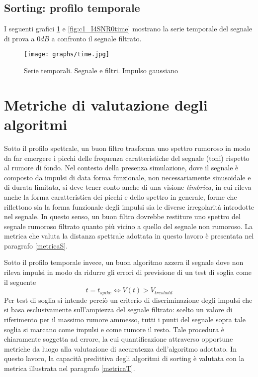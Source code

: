 \documentclass[9pt,twocolumn,twoside]{osajnl}
\begin{document}
\subsection{Sorting: profilo temporale}

I seguenti grafici \ref{fig:c1_I2SNR0time} e \ref{fig:c1_I4SNR0time} mostrano la serie temporale del segnale di prova a $0dB$ a confronto il segnale filtrato.

\begin{figure}[htbp]
\centering
\texttt{[image: graphs/time.jpg]}
\caption{Serie temporali. Segnale e filtri. Impulso gaussiano}
\label{fig:c1_I2SNR0time}
\end{figure}





\section{Metriche di valutazione degli algoritmi}

Sotto il profilo spettrale, un buon filtro trasforma uno spettro rumoroso in modo da far emergere i picchi delle frequenza caratteristiche del segnale (toni) rispetto al rumore di fondo.
%
Nel contesto della presenza simulazione, dove il segnale è composto da impulsi di data forma funzionale, non necessariamente sinusoidale e di durata limitata, si deve tener conto anche di una visione {\it timbrica}, in cui rileva anche la forma caratteristica dei picchi e dello spettro in generale, forme che riflettono sia la forma funzionale degli impulsi sia le diverse irregolarità introdotte nel segnale.
%
In questo senso, un buon filtro dovrebbe restiture uno spettro del segnale rumoroso filtrato quanto più vicino a quello del segnale non rumoroso.
La metrica che valuta la distanza spettrale adottata in questo lavoro è presentata nel paragrafo \ref{metricaS}.

Sotto il profilo temporale invece, un buon algoritmo azzera il segnale dove non rileva impulsi in modo da ridurre gli errori di previsione di un test di soglia come il seguente
\begin{equation*}
t = t_{spike} \Leftrightarrow V(t) > V_{treshold}
\end{equation*}
Per test di soglia si intende perciò un criterio di discriminazione degli impulsi che si basa esclusivamente sull'ampiezza del segnale filtrato: scelto un valore di riferimento per il massimo rumore ammesso, tutti i punti del segnale sopra tale soglia si marcano come impulsi e come rumore il resto.
Tale procedura è chiaramente soggetta ad errore, la cui quantificazione 
attraverso opportune metriche da luogo alla valutazione di accuratezza dell'algoritmo adottato. In questo lavoro, la capacità predittiva degli algoritmi di sorting è valutata con la metrica illustrata nel paragrafo \ref{metricaT}.
\end{document}
